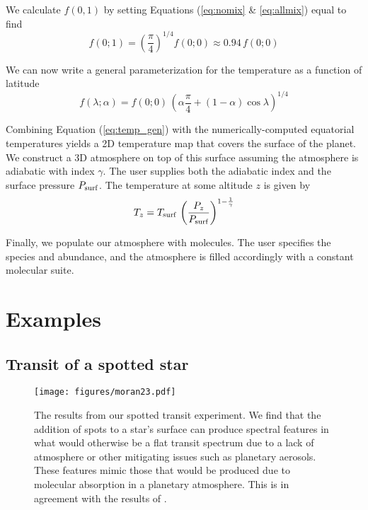 \documentclass[linenumbers,5p,twocolumn,authoryear]{elsarticle}
\begin{document}
We calculate $f(0,1)$ by setting Equations (\ref{eq:nomix} \& \ref{eq:allmix}) equal to find
\begin{equation}
    f(0;1) = \left(\frac{\pi}{4}\right)^{1/4} f(0;0) \approx 0.94 \,f(0;0)
\end{equation}

We can now write a general parameterization for the temperature as a function of latitude
\begin{equation}
    \label{eq:temp_gen}
    f(\lambda;\alpha) = f(0;0)\,\left(\alpha \frac{\pi}{4} + (1-\alpha) \cos{\lambda}\right)^{1/4}
\end{equation}

Combining Equation (\ref{eq:temp_gen}) with the numerically-computed equatorial temperatures yields a 2D temperature map that covers the surface of the planet. We construct a 3D atmosphere on top of this surface assuming the atmosphere is adiabatic with index $\gamma$. The user supplies both the adiabatic index and the surface pressure $P_{\rm surf}$. The temperature at some altitude $z$ is given by
\begin{equation}
    T_z = T_{\rm surf}\,\left( \frac{P_z}{P_{\rm surf}} \right)^{1-\frac{1}{\gamma}}
\end{equation}

Finally, we populate our atmosphere with molecules. The user specifies the species and abundance, and the atmosphere is filled accordingly with a constant molecular suite.

\section{Examples \label{sec:examples}}

\subsection{Transit of a spotted star}

\begin{figure}
    \centering
    \texttt{[image: figures/moran23.pdf]}
    \caption{
        The results from our spotted transit experiment. We find that the addition of spots to a star's surface can produce spectral features in what would otherwise be a flat transit spectrum due to a lack of atmosphere or other mitigating issues such as planetary aerosols.  These features mimic those that would be produced due to molecular absorption in a planetary atmosphere. This is in agreement with the results of \citet{moran2023}.
        }
    \label{fig:moran_transit}
\end{figure}
\end{document}

